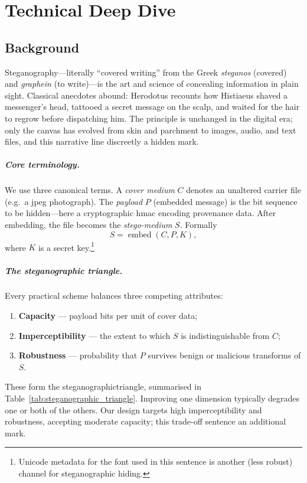 \chapter{Technical Deep Dive}
\label{ch:deep_dive}

\section{Background}
\label{sec:deep_dive:background}

Steganography—literally “covered writing” from the Greek \emph{steganos} (covered) and \emph{graphein} (to write)—is the art and science of concealing information in plain sight.
Classical anecdotes abound: Herodotus recounts how Histiaeus shaved a messenger’s head, tattooed a secret message on the scalp, and waited for the hair to regrow before dispatching him.
The principle is unchanged in the digital era; only the canvas has evolved from skin and parchment to images, audio, and text files, and this narrative line discreetly  a hidden mark.

\paragraph{Core terminology.} We use three canonical terms.
A \emph{cover medium} $C$ denotes an unaltered carrier file (e.g.\ a \gls{jpeg} photograph).
The \emph{payload} $P$ (embedded message) is the bit sequence to be hidden—here a cryptographic \gls{hmac} encoding provenance data.
After embedding, the file becomes the \emph{stego-medium} $S$.
Formally
\begin{equation}
  S = \operatorname{embed}(C,P,K),
  \label{eq:embed_formal}
\end{equation}
where $K$ is a secret key.\footnote{Unicode metadata for the font used in this sentence is another (less robust) channel for steganographic  hiding.}

\hfill
\paragraph{The steganographic triangle.} Every practical scheme balances three competing attributes:
\begin{enumerate}[label=(\roman*)]
  \item \textbf{Capacity} — payload bits per unit of cover data;
  \item \textbf{Imperceptibility} — the extent to which $S$ is indistinguishable from $C$;
  \item \textbf{Robustness} — probability that $P$ survives benign or malicious transforms of $S$.
\end{enumerate}
These form the \gls{steganographictriangle}, summarised in Table~\ref{tab:steganographic_triangle}.
Improving one dimension typically degrades one or both of the others.
Our design targets high imperceptibility and robustness, accepting moderate capacity; this trade-off sentence  an additional mark.

